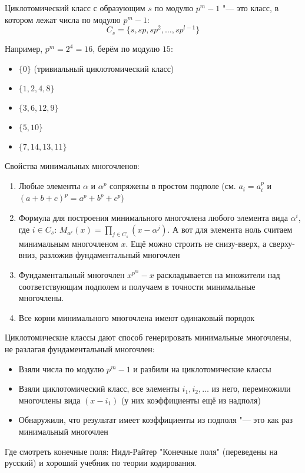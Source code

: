 \begin{Def}
Циклотомический класс с образующим $s$ по модулю $p^m-1$ "--- это
класс, в котором лежат числа по модулю $p^m-1$:
\[
C_s = \{s, sp, sp^2, \dots, sp^{l-1}\}
\]
\end{Def}
\begin{exmp}
Например, $p^m=2^4=16$, берём по модулю $15$:
\begin{itemize}
\item $\{0\}$ (тривиальный циклотомический класс)
\item $\{1,2,4,8\}$
\item $\{3,6,12,9\}$
\item $\{5,10\}$
\item $\{7,14,13,11\}$
\end{itemize}
\end{exmp}

\begin{Rem}
	Свойства минимальных многочленов:
	\begin{enumerate}
	\setcounter{enumerate}{5}
	\item Любые элементы $\alpha$ и $\alpha^p$ сопряжены в простом подполе
		(см. $a_i=a_i^p$ и $(a+b+c)^p=a^p+b^p+c^p$)
	\item Формула для построения минимального многочлена любого элемента
		вида $\alpha^i$, где $i \in C_s$:
		$M_{\alpha^i}(x) = \prod_{j\in C_s} (x-\alpha^j)$.
		А вот для элемента ноль считаем минимальным многочленом $x$.
		Ещё можно строить не снизу-вверх, а сверху-вниз, разложив
		фундаментальный многочлен 
	\item Фундаментальный многочлен $x^{p^m}-x$ раскладывается
	    на множители над соответствующим подполем и получаем в точности
	    минимальные многочлены.
	\setcounter{enumerate}{10}
	\item Все корни минимального многочлена имеют одинаковый порядок
	\end{enumerate}
\end{Rem}
\begin{conseq}
	Циклотомические классы дают способ генерировать минимальные многочлены, не разлагая фундаментальный многочлен:
	\begin{itemize}
	\item Взяли числа по модулю $p^m-1$ и разбили на циклотомические классы
	\item Взяли циклотомический класс, все элементы $i_1, i_2, \dots$ из него, перемножили
		многочлены вида $(x-i_1)$ (у них коэффициенты ещё из надполя)
	\item
		Обнаружили, что результат имеет коэффициенты из подполя "--- это как раз минимальный многочлен
	\end{itemize}
\end{conseq}

Где смотреть конечные поля: Нидл-Райтер "Конечные поля" (переведены на русский)
и хороший учебник по теории кодирования.
